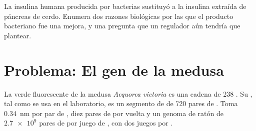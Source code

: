 \begin{exercise}[$\star\star\star$]\label{exo:g10:universal-dna:15}
La insulina humana producida por bacterias sustituyó a la insulina
extraída de páncreas de cerdo. Enumera dos razones biológicas por las
que el producto bacteriano fue una mejora, y una pregunta que un
regulador aún tendría que plantear.
\end{exercise}

\section{Problema: El gen de la medusa}

\begin{problem}
\label{pb:g10:universal-dna:1}
La  verde fluorescente de la medusa \emph{Aequorea victoria} es
una cadena de 238 . Su , tal como se usa en el
laboratorio, es un segmento de  de 720 pares de . Toma
\qty{0.34}{nm} por par de , diez pares de  por vuelta y un
genoma de ratón de $\num{2.7e9}$ pares de  por juego de
, con dos juegos por .


\end{problem}
